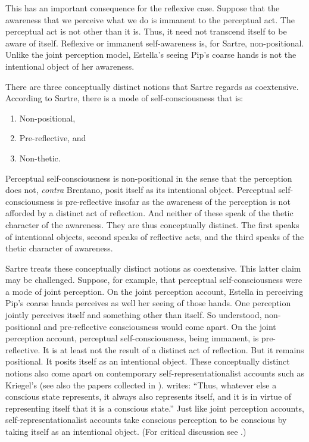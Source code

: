 This has an important consequence for the reflexive case. Suppose that the awareness that we perceive what we do is immanent to the perceptual act. The perceptual act is not other than it is. Thus, it need not transcend itself to be aware of itself. Reflexive or immanent self-awareness is, for Sartre, non-positional. Unlike the joint perception model, Estella's seeing Pip's coarse hands is not the intentional object of her awareness.

There are three conceptually distinct notions that Sartre regards as coextensive. According to Sartre, there is a mode of self-consciousness that is:
\begin{enumerate}[(1)]
	\item Non-positional,
	\item Pre-reflective, and
	\item Non-thetic.
\end{enumerate}

Perceptual self-consciousness is non-positional in the sense that the perception does not, \emph{contra} Brentano, posit itself as its intentional object. Perceptual self-consciousness is pre-reflective insofar as the awareness of the perception is not afforded by a distinct act of reflection. And neither of these speak of the thetic character of the awareness. They are thus conceptually distinct. The first speaks of intentional objects, second speaks of reflective acts, and the third speaks of the thetic character of awareness. 

Sartre treats these conceptually distinct notions as coextensive. This latter claim may be challenged. Suppose, for example, that perceptual self-consciousness were a mode of joint perception. On the joint perception account, Estella in perceiving Pip's coarse hands perceives as well her seeing of those hands. One perception jointly perceives itself and something other than itself. So understood, non-positional and pre-reflective consciousness would come apart. On the joint perception account, perceptual self-consciousness, being immanent, is pre-reflective. It is at least not the result of a distinct act of reflection. But it remains positional. It posits itself as an intentional object. These conceptually distinct notions also come apart on contemporary self-representationalist accounts such as Kriegel's \citeyearpar{Kriegel:2009kg} (see also the papers collected in \citealt{Kriegel:2006qb}). \citet[13–14]{Kriegel:2009kg} writes: ``Thus, whatever else a conscious state represents, it always also represents itself, and it is in virtue of representing itself that it is a conscious state.'' Just like joint perception accounts, self-representationalist accounts take conscious perception to be conscious by taking itself as an intentional object. (For critical discussion see \citealt{Frank:2016xd}.)

